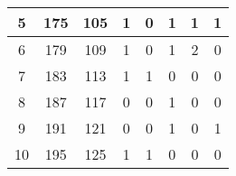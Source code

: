 \begin{table}[!h]
\begin{tabular}{|c|c|c|c|c|c|c|c|}
		5                                                 & 175                                               & 105                                               & 1                                                 & 0                                                 & 1                                                 & 1                                                 & 1                                                 \\ \hline
		6                                                 & 179                                               & 109                                               & 1                                                 & 0                                                 & 1                                                 & 2                                                 & 0                                                 \\ \hline
		7                                                 & 183                                               & 113                                               & 1                                                 & 1                                                 & 0                                                 & 0                                                 & 0                                                 \\ \hline
		8                                                 & 187                                               & 117                                               & 0                                                 & 0                                                 & 1                                                 & 0                                                 & 0                                                 \\ \hline
		9                                                 & 191                                               & 121                                               & 0                                                 & 0                                                 & 1                                                 & 0                                                 & 1                                                 \\ \hline
		10                                                & 195                                               & 125                                               & 1                                                 & 1                                                 & 0                                                 & 0                                                 & 0                                                 \\ \hline

\end{tabular}
\end{table}
